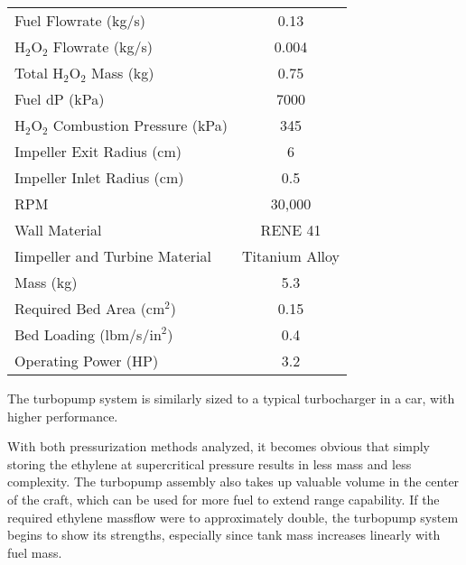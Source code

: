 \begin{center}
\begin{tabular}{l  c}
Fuel Flowrate (kg/s) & 0.13 \\
$\text{H}_2\text{O}_2$ Flowrate (kg/s) & 0.004 \\
Total $\text{H}_2\text{O}_2$ Mass (kg) & 0.75 \\
Fuel dP (kPa) & 7000 \\
$\text{H}_2\text{O}_2$ Combustion Pressure (kPa) & 345 \\
Impeller Exit Radius (cm) & 6 \\
Impeller Inlet Radius (cm) & 0.5 \\
RPM & 30,000 \\
Wall Material & RENE 41 \\
Iimpeller and Turbine Material & Titanium Alloy \\
Mass (kg) & 5.3 \\
Required Bed Area ($\text{cm}^2$) & 0.15 \\
Bed Loading (lbm/s/$\text{in}^2$) & 0.4 \\
Operating Power (HP) & 3.2
\end{tabular}
\end{center}

The turbopump system is similarly sized to a typical turbocharger in a car, with higher performance. 

With both pressurization methods analyzed, it becomes obvious that simply storing the ethylene at supercritical pressure results in less mass and less complexity. The turbopump assembly also takes up valuable volume in the center of the craft, which can be used for more fuel to extend range capability. If the required ethylene massflow were to approximately double, the turbopump system begins to show its strengths, especially since tank mass increases linearly with fuel mass. 
 
